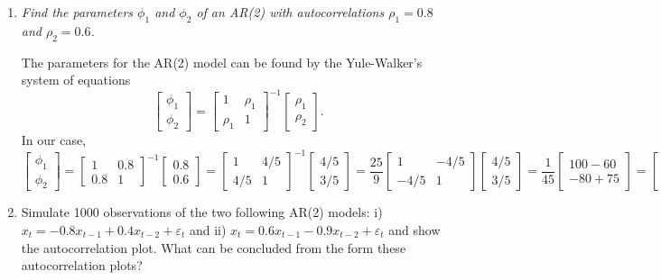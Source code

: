 \documentclass[fleqn]{article}
\begin{document}
\begin{enumerate}
\item \textit{Find the parameters $\phi_1$ and $\phi_2$ of an AR(2) with autocorrelations $\rho_1=0.8$ and $\rho_2=0.6$.}

The parameters for the AR(2) model can be found by the Yule-Walker's system of equations
\[
\begin{bmatrix}
\phi_1\\\phi_2
\end{bmatrix} = \begin{bmatrix}1 & \rho_1\\\rho_1 & 1\end{bmatrix}^{-1}\begin{bmatrix}
\rho_1 \\ \rho_2
\end{bmatrix}.
\]
In our case,
\[
\begin{bmatrix}
\phi_1\\\phi_2
\end{bmatrix} = \begin{bmatrix}1 & 0.8\\0.8 & 1\end{bmatrix}^{-1}\begin{bmatrix}
0.8 \\ 0.6
\end{bmatrix}=\begin{bmatrix}1 & 4/5\\4/5 & 1\end{bmatrix}^{-1}\begin{bmatrix}
4/5 \\ 3/5
\end{bmatrix}=\dfrac{25}{9}\begin{bmatrix}1 & -4/5\\-4/5 & 1\end{bmatrix}\begin{bmatrix}
4/5 \\ 3/5
\end{bmatrix}=\dfrac{1}{45}\begin{bmatrix}100-60\\-80+75\end{bmatrix}=\begin{bmatrix}8/9\\-1/9\end{bmatrix}.
\]

\item Simulate 1000 observations of the two following AR(2) models: i) $x_t=-0.8x_{t-1}+0.4x_{t-2}+\varepsilon_t$ and ii) $x_t=0.6x_{t-1}-0.9x_{t-2}+\varepsilon_t$ and show the autocorrelation plot. What can be concluded from the form these autocorrelation plots?


\end{enumerate}
\end{document}
